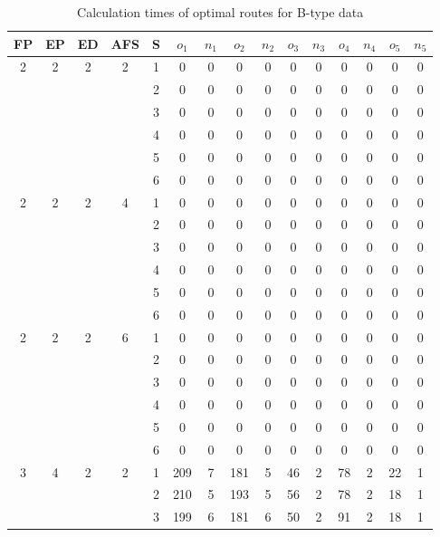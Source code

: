 \begin{longtable}{|c|c|c|c|c|c c|c c|c c|c c|c c|}
\caption{Calculation times of optimal routes for B-type data}
\label{tab:time_b} \\
\hline
FP  & EP & ED & AFS & S & $o_1$ & $n_1$ & $o_2$ & $n_2$ & $o_3$ & $n_3$ & $o_4$ & $n_4$ & $o_5$ & $n_5$\\
\hline\hline\multirow{6}{*}{2} & \multirow{6}{*}{2} & \multirow{6}{*}{2} & \multirow{6}{*}{2} & 1 & 0 & 0 & 0 & 0 & 0 & 0 & 0 & 0 & 0 & 0 \\
 & & & & 2 & 0 & 0 & 0 & 0 & 0 & 0 & 0 & 0 & 0 & 0 \\
 & & & & 3 & 0 & 0 & 0 & 0 & 0 & 0 & 0 & 0 & 0 & 0 \\
 & & & & 4 & 0 & 0 & 0 & 0 & 0 & 0 & 0 & 0 & 0 & 0 \\
 & & & & 5 & 0 & 0 & 0 & 0 & 0 & 0 & 0 & 0 & 0 & 0 \\
 & & & & 6 & 0 & 0 & 0 & 0 & 0 & 0 & 0 & 0 & 0 & 0 \\
\hline
\multirow{6}{*}{2} & \multirow{6}{*}{2} & \multirow{6}{*}{2} & \multirow{6}{*}{4} & 1 & 0 & 0 & 0 & 0 & 0 & 0 & 0 & 0 & 0 & 0 \\
 & & & & 2 & 0 & 0 & 0 & 0 & 0 & 0 & 0 & 0 & 0 & 0 \\
 & & & & 3 & 0 & 0 & 0 & 0 & 0 & 0 & 0 & 0 & 0 & 0 \\
 & & & & 4 & 0 & 0 & 0 & 0 & 0 & 0 & 0 & 0 & 0 & 0 \\
 & & & & 5 & 0 & 0 & 0 & 0 & 0 & 0 & 0 & 0 & 0 & 0 \\
 & & & & 6 & 0 & 0 & 0 & 0 & 0 & 0 & 0 & 0 & 0 & 0 \\
\hline
\multirow{6}{*}{2} & \multirow{6}{*}{2} & \multirow{6}{*}{2} & \multirow{6}{*}{6} & 1 & 0 & 0 & 0 & 0 & 0 & 0 & 0 & 0 & 0 & 0 \\
 & & & & 2 & 0 & 0 & 0 & 0 & 0 & 0 & 0 & 0 & 0 & 0 \\
 & & & & 3 & 0 & 0 & 0 & 0 & 0 & 0 & 0 & 0 & 0 & 0 \\
 & & & & 4 & 0 & 0 & 0 & 0 & 0 & 0 & 0 & 0 & 0 & 0 \\
 & & & & 5 & 0 & 0 & 0 & 0 & 0 & 0 & 0 & 0 & 0 & 0 \\
 & & & & 6 & 0 & 0 & 0 & 0 & 0 & 0 & 0 & 0 & 0 & 0 \\
\hline
\multirow{6}{*}{3} & \multirow{6}{*}{4} & \multirow{6}{*}{2} & \multirow{6}{*}{2} & 1 & 209 & 7 & 181 & 5 & 46 & 2 & 78 & 2 & 22 & 1 \\
 & & & & 2 & 210 & 5 & 193 & 5 & 56 & 2 & 78 & 2 & 18 & 1 \\
 & & & & 3 & 199 & 6 & 181 & 6 & 50 & 2 & 91 & 2 & 18 & 1 \\

\end{longtable}

